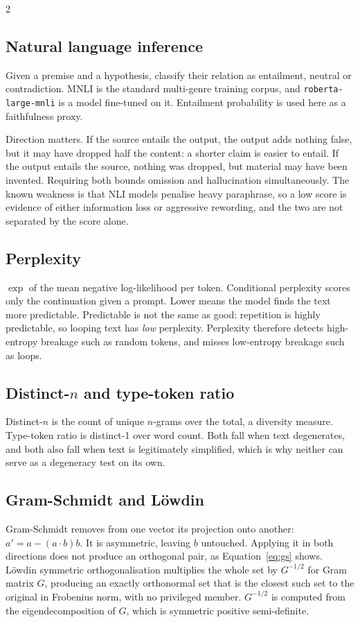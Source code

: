 \documentclass[twocolumn,10pt,a4paper]{article}
\newcommand{\code}[1]{\texttt{\small #1}}
\begin{document}
\begin{multicols}{2}
\subsection*{Natural language inference}
Given a premise and a hypothesis, classify their relation as entailment, neutral
or contradiction. MNLI is the standard multi-genre training corpus, and
\code{roberta-large-mnli} is a model fine-tuned on it. Entailment probability is
used here as a faithfulness proxy.

Direction matters. If the source entails the output, the output adds nothing
false, but it may have dropped half the content: a shorter claim is easier to
entail. If the output entails the source, nothing was dropped, but material may
have been invented. Requiring both bounds omission and hallucination
simultaneously. The known weakness is that NLI models penalise heavy paraphrase,
so a low score is evidence of either information loss or aggressive rewording,
and the two are not separated by the score alone.

\subsection*{Perplexity}
$\exp$ of the mean negative log-likelihood per token. Conditional perplexity
scores only the continuation given a prompt. Lower means the model finds the text
more predictable. Predictable is not the same as good: repetition is highly
predictable, so looping text has \emph{low} perplexity. Perplexity therefore
detects high-entropy breakage such as random tokens, and misses low-entropy
breakage such as loops.

\subsection*{Distinct-$n$ and type-token ratio}
Distinct-$n$ is the count of unique $n$-grams over the total, a diversity
measure. Type-token ratio is distinct-1 over word count. Both fall when text
degenerates, and both also fall when text is legitimately simplified, which is
why neither can serve as a degeneracy test on its own.

\subsection*{Gram-Schmidt and L\"owdin}
Gram-Schmidt removes from one vector its projection onto another:
$a' = a - (a\cdot b)b$. It is asymmetric, leaving $b$ untouched. Applying it in
both directions does not produce an orthogonal pair, as Equation~\ref{eq:gs}
shows. L\"owdin symmetric orthogonalisation multiplies the whole set by
$G^{-1/2}$ for Gram matrix $G$, producing an exactly orthonormal set that is the
closest such set to the original in Frobenius norm, with no privileged member.
$G^{-1/2}$ is computed from the eigendecomposition of $G$, which is symmetric
positive semi-definite.


\end{multicols}
\end{document}
